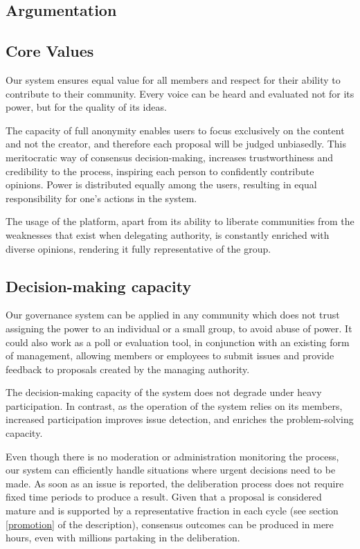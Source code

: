 \documentclass[a4paper,11pt]{article}
\begin{document}
\begin{multicols}{2}
\section{Argumentation} \label{argumentation}

\subsection{Core Values} \label{core}

Our system ensures equal value for all members and respect for their ability to contribute to their community. Every voice can be heard and evaluated not for its power, but for the quality of its ideas.

The capacity of full anonymity enables users to focus exclusively on the content and not the creator, and therefore each proposal will be judged unbiasedly. This meritocratic way of consensus decision-making, increases trustworthiness and credibility to the process, inspiring each person to confidently contribute opinions. Power is distributed equally among the users, resulting in equal responsibility for one's actions in the system. 

The usage of the platform, apart from its ability to liberate communities from the weaknesses that exist when delegating authority, is constantly enriched with diverse opinions, rendering it fully representative of the group.

\subsection{Decision-making capacity} \label{capacity}

Our governance system can be applied in any community which does not trust assigning the power to an individual or a small group, to avoid abuse of power. It could also work as a poll or evaluation tool, in conjunction with an existing form of management, allowing members or employees to submit issues and provide feedback to proposals created by the managing authority.

The decision-making capacity of the system does not degrade under heavy participation. In contrast, as the operation of the system relies on its members, increased participation improves issue detection, and enriches the problem-solving capacity.

Even though there is no moderation or administration monitoring the process, our system can efficiently handle situations where urgent decisions need to be made. As soon as an issue is reported, the deliberation process does not require fixed time periods to produce a result. Given that a proposal is considered mature and is supported by a representative fraction in each cycle (see section \ref{promotion} of the description), consensus outcomes can be produced in mere hours, even with millions partaking in the deliberation.


\end{multicols}
\end{document}
